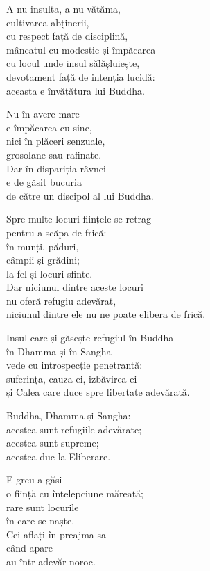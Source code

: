 A nu insulta, a nu vătăma,\\
cultivarea abținerii,\\
cu respect față de disciplină,\\
mâncatul cu modestie și împăcarea\\
cu locul unde insul sălășluiește,\\
devotament față de intenția lucidă:\\
aceasta e învățătura lui Buddha.


Nu în avere mare\\
e împăcarea cu sine,\\
nici în plăceri senzuale,\\
grosolane sau rafinate.\\
Dar în dispariția râvnei\\
e de găsit bucuria\\
de către un discipol al lui Buddha.


Spre multe locuri ființele se retrag\\
pentru a scăpa de frică:\\
în munți, păduri,\\
câmpii și grădini;\\
la fel și locuri sfinte.\\
Dar niciunul dintre aceste locuri\\
nu oferă refugiu adevărat,\\
niciunul dintre ele nu ne poate elibera de frică.


Insul care-și găsește refugiul în Buddha\\
în Dhamma și în Sangha\\
vede cu introspecție penetrantă:\\
suferința, cauza ei, izbăvirea ei\\
și Calea care duce spre libertate adevărată.


Buddha, Dhamma și Sangha:\\
acestea sunt refugiile adevărate;\\
acestea sunt supreme;\\
acestea duc la Eliberare.


E greu a găsi\\
o ființă cu înțelepciune măreață;\\
rare sunt locurile\\
în care se naște.\\
Cei aflați în preajma sa\\
când apare\\
au într-adevăr noroc.


